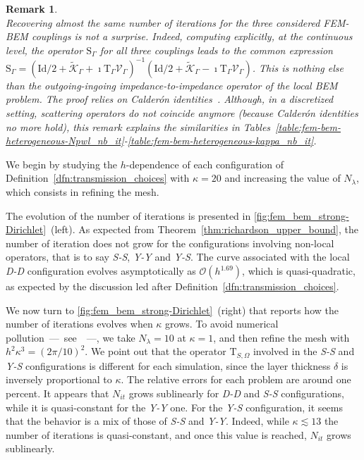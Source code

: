 \documentclass[a4paper,11pt]{article}
\newcommand{\Id}{\mathrm{Id}}
\newcommand{\mT}{\mathrm{T}}
\newcommand{\mS}{\mathrm{S}}
\newcommand{\DespresDespres}{\textit{D-D}}
\newcommand{\SchurSchur}{\textit{S-S}}
\newcommand{\SchurYukawa}{\textit{Y-S}}
\newcommand{\YukawaYukawa}{\textit{Y-Y}}
\newcommand{\figpart}[2]{\cref{#1}~(#2)}
\newtheorem{rem}[defn]{Remark}
\begin{document}
\begin{rem}\quad\\
  Recovering almost the same number of iterations for the three considered
  FEM-BEM couplings is not a surprise. Indeed, computing explicitly, at the
  continuous level, the operator \(\mS_{\Gamma}\) for all three couplings
  leads to the common expression \(\mS_{\Gamma} =
  (\Id/2+\tilde{\mathcal{K}}_{\Gamma}+ \imath
  \mT_{\Gamma}\mathcal{V}_{\Gamma})^{-1}
  (\Id/2+\tilde{\mathcal{K}}_{\Gamma} - \imath
  \mT_{\Gamma}\mathcal{V}_{\Gamma})\). This is nothing else than the
  outgoing-ingoing impedance-to-impedance operator of the local BEM
  problem. The proof relies on Calderón identities~\cite[Proposition
    3.6.4.]{MR2743235}. Although, in a discretized
  setting, scattering operators do not coincide anymore (because Calderón identities no more hold),
  this remark explains the similarities in
  Tables~\ref{table:fem-bem-heterogeneous-Npwl_nb_it}-\ref{table:fem-bem-heterogeneous-kappa_nb_it}.
\end{rem}

We begin by studying the \(h\)-dependence of each configuration of Definition~\ref{dfn:transmission_choices} with \(\kappa = 20\) and increasing the value of \(N_{\lambda}\), which consists in refining the mesh.

The evolution of the number of iterations is presented in \figpart{fig:fem_bem_strong-Dirichlet}{left}.
As expected from Theorem~\ref{thm:richardson_upper_bound}, the number of iteration does not grow for the configurations involving non-local operators, that is to say \SchurSchur, \YukawaYukawa{} and \SchurYukawa.
The curve associated with the local \DespresDespres{} configuration evolves asymptotically as \(\mathcal{O}(h^{1.69})\), which is quasi-quadratic, as expected by the discussion led after Definition~\ref{dfn:transmission_choices}.

We now turn to \figpart{fig:fem_bem_strong-Dirichlet}{right} that reports how the number of iterations evolves when \(\kappa\) grows. To avoid numerical pollution~---~see~\cite{IhlenburgFEA,IhlenburgBabuska1995FES,BabuskaSauter1997IPE,DeraemaekerBabuskaEtAl1999MDL}~---, we take \(N_{\lambda}=10\) at \(\kappa = 1\), and then refine the mesh with \(h^2 \kappa^3 = (2\pi/10)^2\). We point out that the operator \(\mT_{S,\Omega}\) involved in the \SchurSchur{} and \SchurYukawa{} configurations is different for each simulation, since the layer thickness \(\delta\) is inversely proportional to \(\kappa\). The relative errors for each problem are around one percent. 
It appears that \(N_{it}\) grows sublinearly for \DespresDespres{} and \SchurSchur{} configurations, while it is quasi-constant for the \YukawaYukawa{} one. For the \SchurYukawa{} configuration, it seems that the behavior is a mix of those of \SchurSchur{} and \YukawaYukawa. Indeed, while \(\kappa \lesssim 13\) the number of iterations is quasi-constant, and once this value is reached, \(N_{it}\) grows sublinearly.
\end{document}

